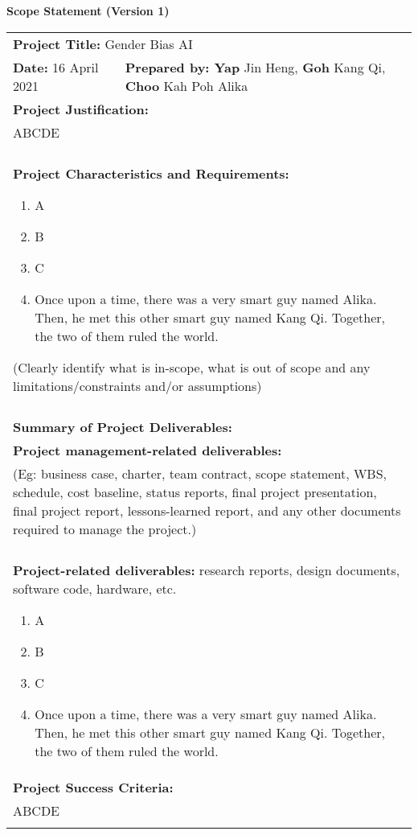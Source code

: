\begin{center}
    \textbf{Scope Statement (Version 1)}
\end{center}

\begin{longtable}{ | p{} l | }
    \hline
    \multicolumn{2}{|l|}{\textbf{Project Title:} Gender Bias AI} \\
    \textbf{Date:} 16 April 2021 &
    \textbf{Prepared by: Yap} Jin Heng, \textbf{Goh} Kang Qi, \textbf{Choo} Kah Poh Alika \\
    \hline
    \multicolumn{2}{|l|}{\textbf{Project Justification:}} \\
    \multicolumn{2}{|p{\textwidth}|}{ABCDE} \\
    & \\
    \hline
    \multicolumn{2}{|p{\textwidth}|}{\textbf{Project Characteristics and Requirements:}
        \begin{enumerate}
            \item A
            \item B
            \item C
            \item Once upon a time, there was a very smart guy named Alika. Then, he met this other smart guy named Kang Qi. Together, the two of them ruled the world.
        \end{enumerate}
    (Clearly identify what is in-scope, what is out of scope and any limitations/constraints and/or assumptions)
    } \\
    & \\
    \hline
    \multicolumn{2}{|l|}{\textbf{Summary of Project Deliverables:}} \\
    \multicolumn{2}{|l|}{\textbf{Project management-related deliverables:}} \\
    \multicolumn{2}{|p{\textwidth}|}{(Eg: business case, charter, team contract, scope statement, WBS, schedule, cost baseline, status reports, final project presentation, final project report, lessons-learned report, and any other documents required to manage the project.)} \\
    & \\
    \multicolumn{2}{|p{\textwidth}|}{\textbf{Project-related deliverables:} research reports, design documents, software code, hardware, etc.
        \begin{enumerate}
            \item A
            \item B
            \item C
            \item Once upon a time, there was a very smart guy named Alika. Then, he met this other smart guy named Kang Qi. Together, the two of them ruled the world.
        \end{enumerate}
    } \\
    \hline
    \multicolumn{2}{|l|}{\textbf{Project Success Criteria:}} \\
    \multicolumn{2}{|p{\textwidth}|}{ABCDE} \\
    & \\
    \hline
\end{longtable}
